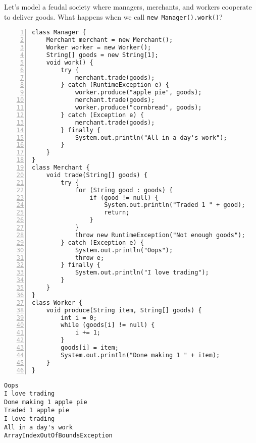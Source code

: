 \question Let's model a feudal society where managers, merchants, and workers cooperate to deliver goods. What happens when we call \texttt{new Manager().work()}?

\begin{lstlisting}[basicstyle=\ttfamily\footnotesize,
                   numberstyle=\ttfamily\tiny, numbers=left]
class Manager {
    Merchant merchant = new Merchant();
    Worker worker = new Worker();
    String[] goods = new String[1];
    void work() {
        try {
            merchant.trade(goods);
        } catch (RuntimeException e) {
            worker.produce("apple pie", goods);
            merchant.trade(goods);
            worker.produce("cornbread", goods);
        } catch (Exception e) {
            merchant.trade(goods);
        } finally {
            System.out.println("All in a day's work");
        }
    }
}
class Merchant {
    void trade(String[] goods) {
        try {
            for (String good : goods) {
                if (good != null) {
                    System.out.println("Traded 1 " + good);
                    return;
                }
            }
            throw new RuntimeException("Not enough goods");
        } catch (Exception e) {
            System.out.println("Oops");
            throw e;
        } finally {
            System.out.println("I love trading");
        }
    }
}
class Worker {
    void produce(String item, String[] goods) {
        int i = 0;
        while (goods[i] != null) {
            i += 1;
        }
        goods[i] = item;
        System.out.println("Done making 1 " + item);
    }
}
\end{lstlisting}

\begin{solution}
\begin{verbatim}
Oops
I love trading
Done making 1 apple pie
Traded 1 apple pie
I love trading
All in a day's work
ArrayIndexOutOfBoundsException
\end{verbatim}
\end{solution}
